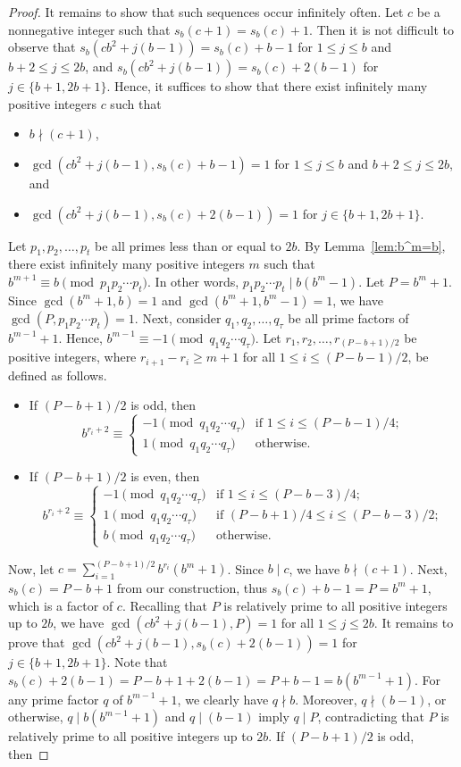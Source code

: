 \documentclass[10pt,a4paper]{amsart}
\begin{document}
\begin{proof}
It remains to show that such sequences occur infinitely often. Let $c$ be a nonnegative integer such that $s_b(c+1)=s_b(c)+1$. Then it is not difficult to observe that $s_b(cb^2+j(b-1))=s_b(c)+b-1$ for $1\leq j\leq b$ and $b+2\leq j\leq 2b$, and $s_b(cb^2+j(b-1))=s_b(c)+2(b-1)$ for $j\in\{b+1,2b+1\}$. Hence, it suffices to show that there exist infinitely many positive integers $c$ such that
\begin{itemize}
\item $b\nmid(c+1)$,
\item $\gcd(cb^2+j(b-1),s_b(c)+b-1)=1$ for $1\leq j\leq b$ and $b+2\leq j\leq 2b$, and
\item $\gcd(cb^2+j(b-1),s_b(c)+2(b-1))=1$ for $j\in\{b+1,2b+1\}$.
\end{itemize}
Let $p_1,p_2,\dotsc,p_t$ be all primes less than or equal to $2b$. By Lemma~\ref{lem:b^m=b}, there exist infinitely many positive integers $m$ such that $b^{m+1}\equiv b\pmod{p_1p_2\dotsb p_t}$. In other words, $p_1p_2\dotsb p_t\mid b(b^m-1)$. Let $P=b^m+1$. Since $\gcd(b^m+1,b)=1$ and $\gcd(b^m+1,b^m-1)=1$, we have $\gcd(P,p_1p_2\dotsb p_t)=1$. Next, consider $q_1,q_2,\dotsc,q_\tau$ be all prime factors of $b^{m-1}+1$. Hence, $b^{m-1}\equiv-1\pmod{q_1q_2\dotsb q_\tau}$. Let $r_1,r_2,\dotsc,r_{(P-b+1)/2}$ be positive integers, where $r_{i+1}-r_i\geq m+1$ for all $1\leq i\leq(P-b-1)/2$, be defined as follows.
\begin{itemize}
\item If $(P-b+1)/2$ is odd, then
$$b^{r_i+2}\equiv\begin{cases}
-1\pmod{q_1q_2\dotsb q_\tau}&\text{if }1\leq i\leq(P-b-1)/4;\\
1\pmod{q_1q_2\dotsb q_\tau}&\text{otherwise}.
\end{cases}$$
\item If $(P-b+1)/2$ is even, then
$$b^{r_i+2}\equiv\begin{cases}
-1\pmod{q_1q_2\dotsb q_\tau}&\text{if }1\leq i\leq(P-b-3)/4;\\
1\pmod{q_1q_2\dotsb q_\tau}&\text{if }(P-b+1)/4\leq i\leq(P-b-3)/2;\\
b\pmod{q_1q_2\dotsb q_\tau}&\text{otherwise}.
\end{cases}$$
\end{itemize}
Now, let $c=\sum_{i=1}^{(P-b+1)/2}b^{r_i}(b^m+1)$. Since $b\mid c$, we have $b\nmid(c+1)$. Next, $s_b(c)=P-b+1$ from our construction, thus $s_b(c)+b-1=P=b^m+1$, which is a factor of $c$. Recalling that $P$ is relatively prime to all positive integers up to $2b$, we have $\gcd(cb^2+j(b-1),P)=1$ for all $1\leq j\leq 2b$. It remains to prove that $\gcd(cb^2+j(b-1),s_b(c)+2(b-1))=1$ for $j\in\{b+1,2b+1\}$. Note that $s_b(c)+2(b-1)=P-b+1+2(b-1)=P+b-1=b(b^{m-1}+1)$. For any prime factor $q$ of $b^{m-1}+1$, we clearly have $q\nmid b$. Moreover, $q\nmid(b-1)$, or otherwise, $q\mid b(b^{m-1}+1)$ and $q\mid(b-1)$ imply $q\mid P$, contradicting that $P$ is relatively prime to all positive integers up to $2b$. If $(P-b+1)/2$ is odd, then

\end{proof}
\end{document}
